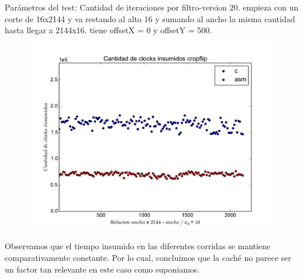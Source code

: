 Parámetros del test: 
Cantidad de iteraciones por filtro-version 20.
empieza con un corte de 16x2144 y va restando al alto 16 y sumando al ancho la misma cantidad hasta llegar a 2144x16. tiene offsetX = 0 y offsetY = 500.

\begin{figure}[h]
  \begin{center}
	\includegraphics[scale=0.5]{cachecropflip.pdf}
  \end{center}
\end{figure}


Observamos que el tiempo insumido en las diferentes corridas se mantiene comparativamente constante. Por lo cual, concluimos que la caché no parece ser un factor tan relevante en este caso como suponiamos. 
